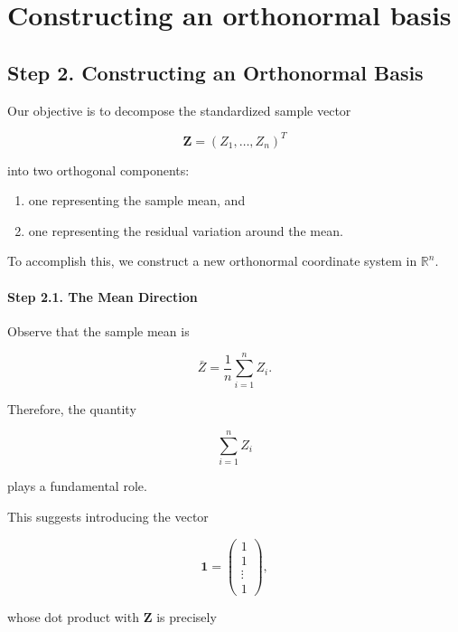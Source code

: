 \documentclass[11pt]{article}
\begin{document}
	\section{Constructing an orthonormal basis}
	\begin{mdframed}[
		linewidth=0.8pt,
		roundcorner=6pt,
		backgroundcolor=gray!5,
		linecolor=gray!60,
		innertopmargin=10pt,
		innerbottommargin=10pt,
		innerleftmargin=10pt,
		innerrightmargin=10pt
		]
		
		\subsection*{Step 2. Constructing an Orthonormal Basis}
		
		Our objective is to decompose the standardized sample vector
		
		\[
		\mathbf Z
		=
		(Z_1,\ldots,Z_n)^T
		\]
		
		into two orthogonal components:
		
		\begin{enumerate}
			\item one representing the sample mean, and
			\item one representing the residual variation around the mean.
		\end{enumerate}
		
		To accomplish this, we construct a new orthonormal coordinate system in
		$\mathbb R^n$.
		
		\paragraph{Step 2.1. The Mean Direction}
		
		Observe that the sample mean is
		
		\[
		\bar Z
		=
		\frac1n
		\sum_{i=1}^{n}Z_i.
		\]
		
		Therefore, the quantity
		
		\[
		\sum_{i=1}^{n}Z_i
		\]
		
		plays a fundamental role.
		
		This suggests introducing the vector
		
		\[
		\mathbf 1
		=
		\begin{pmatrix}
			1\\
			1\\
			\vdots\\
			1
		\end{pmatrix},
		\]
		
		whose dot product with $\mathbf Z$ is precisely
		

\end{mdframed}
\end{document}
